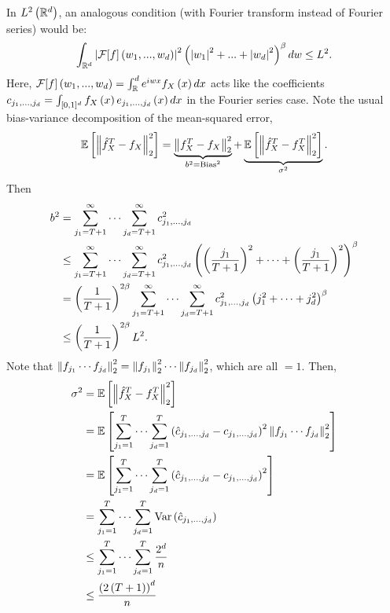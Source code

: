 {In $L^2\left(\mathbb{R}^d\right)$, an analogous condition (with Fourier transform instead of Fourier series) would be:
\begin{equation*}
  \int_{\mathbb{R}^d} \left| \mathcal F[f]\left(w_1,...,w_d\right)\right|^2\left(\left| w_1\right|^2+...+\left| w_d\right|^2\right)^\beta dw \leq L^2.
\end{equation*}}
Here, $\mathcal{F}[f]\left(w_1,...,w_d\right)=\int_\mathbb{R}^d e^{iwx} f_X\left(x\right)dx$ acts like the coefficients $c_{j_1,...,j_d}=\int_{[0,1]^d} f_X\left(x\right) e_{j_1,...,j_d}\left(x\right)dx$ in the Fourier series case.
Note the usual bias-variance decomposition of the mean-squared error,
\begin{equation*}
  \mathbb{E}\left[\left\| \hat f_X^T - f_X \right\|^2_2\right] = \underbrace{\left\| f_X^T - f_X  \right\|^2_2}_{b^2=\text{Bias}^2} + \underbrace{\mathbb{E}\left[\left\| \hat{f}_X^T - f_X^T \right\|_2^2\right]}_{\sigma^2}.
\end{equation*}
Then
\begin{equation*}
  \begin{split}
    b^2 & = \sum_{j_1 = T+1}^\infty \cdots \sum_{j_d = T+1}^\infty c^2_{j_1,\ldots, j_d}                                                                        \\
        & \leq \sum_{j_1 = T+1}^\infty \cdots \sum_{j_d = T+1}^\infty c^2_{j_1,\ldots, j_d} \left(\left(\frac{j_1}{T+1}\right)^2 + \cdots + \left(\frac{j_1}{T+1}\right)^2\right)^\beta \\
        & = \left(\frac{1}{T+1}\right)^{2\beta } \sum_{j_1 = T+1}^\infty \cdots \sum_{j_d = T+1}^\infty c^2_{j_1,\ldots, j_d} \left(j_1^2 + \cdots + j_d^2\right)^\beta         \\
        & \leq \left(\frac{1}{T+1}\right)^{2\beta} L^2.
  \end{split}
\end{equation*}
Note that $\left\| f_{j_1}\cdots f_{j_d} \right\|_2^2 = \left\| f_{j_1} \right\|_2^2 \cdots \left\| f_{j_d} \right\|_2^2$, which are all $=1$. Then,
\begin{equation*}
  \begin{split}
    \sigma^2 & = \mathbb{E}\left[ \left\| \hat{f}_X^T - f_X^T \right\|_2^2\right]                                                                                             \\
             & = \mathbb{E}\left[\sum_{j_1=1}^T \cdots \sum_{j_d=1}^T \left(\hat{c}_{j_1,\ldots,j_d} - c_{j_1,\ldots, j_d}\right)^2\left\| f_{j_1}\cdots f_{j_d} \right\|^2_2 \right] \\
             & = \mathbb{E}\left[\sum_{j_1=1}^T \cdots \sum_{j_d=1}^T \left(\hat{c}_{j_1,\ldots,j_d} - c_{j_1,\ldots, j_d}\right)^2\right]                                  \\
             & = \sum_{j_1=1}^T \cdots \sum_{j_d=1}^T \mathrm{Var}\left(\hat c_{j_1,...,j_d}\right)                                                                  \\
             & \leq \sum_{j_1=1}^T \cdots \sum_{j_d=1}^T \frac{2^d}{n}                                                                               \\
             & \leq \frac{\left(2 \left(T+1\right) \right)^d }{n}
  \end{split}
\end{equation*}
